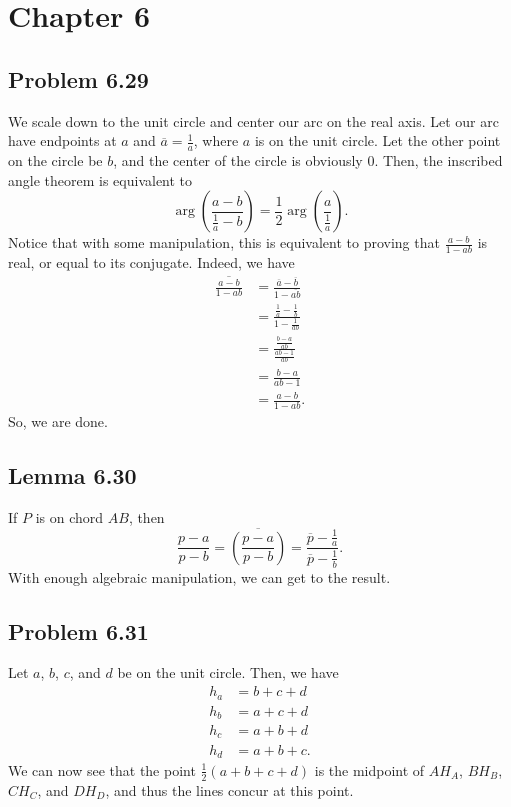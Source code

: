 \documentclass{scrartcl}
\begin{document}
\section*{Chapter 6}
\subsection*{Problem 6.29}
We scale down to the unit circle and center our arc on the real axis. Let our arc have endpoints at $a$ and $\overline{a} = \frac{1}{a}$, where $a$ is on the unit circle. Let the other point on the circle be $b$, and the center of the circle is obviously $0$.
Then, the inscribed angle theorem is equivalent to
\[
    \arg \left(\frac{a-b}{\frac{1}{a}-b}\right) = \frac{1}{2} \arg \left(\frac{a}{\frac{1}{a}}\right).
\]
Notice that with some manipulation, this is equivalent to proving that $\frac{a-b}{1-ab}$ is real, or equal to its conjugate. Indeed, we have
\begin{align*}
    \overline{\frac{a-b}{1-ab}} &= \frac{\overline{a} - \overline{b}}{1 - \overline{ab}} \\
    &= \frac{\frac{1}{a} - \frac{1}{b}}{1 - \frac{1}{ab}} \\
    &= \frac{\frac{b - a}{ab}}{\frac{ab - 1}{ab}} \\
    &= \frac{b-a}{ab-1} \\
    &= \frac{a-b}{1-ab}.
\end{align*}
So, we are done.
\subsection*{Lemma 6.30}
If $P$ is on chord $AB$, then
\[
    \frac{p-a}{p-b} = \overline{\left(\frac{p-a}{p-b}\right)} = \frac{\overline{p} - \frac{1}{a}}{\overline{p} - \frac{1}{b}}.
\]
With enough algebraic manipulation, we can get to the result.
\subsection*{Problem 6.31}
Let $a$, $b$, $c$, and $d$ be on the unit circle. Then, we have
\begin{align*}
    h_a &= b + c + d \\
    h_b &= a + c + d \\
    h_c &= a + b + d \\
    h_d &= a + b + c.
\end{align*}
We can now see that the point $\frac{1}{2} (a + b + c + d)$ is the midpoint of $AH_A$, $BH_B$, $CH_C$, and $DH_D$, and thus the lines concur at this point.
\end{document}
